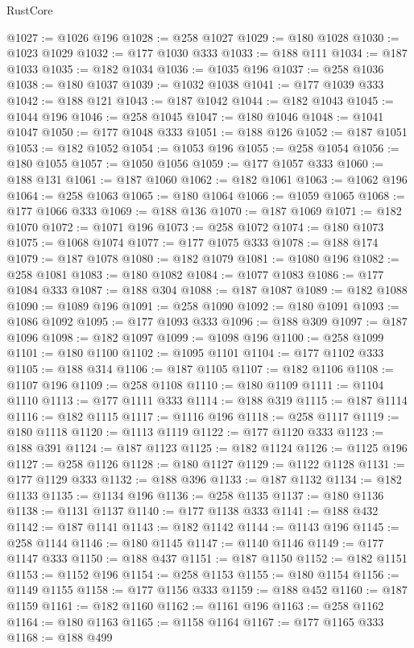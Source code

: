 \begin{lexlean}{RustCore}
\begin{coremodule}
@1027 := @1026 @196
@1028 := @258 @1027
@1029 := @180 @1028
@1030 := @1023 @1029
@1032 := @177 @1030 @333
@1033 := @188 @111
@1034 := @187 @1033
@1035 := @182 @1034
@1036 := @1035 @196
@1037 := @258 @1036
@1038 := @180 @1037
@1039 := @1032 @1038
@1041 := @177 @1039 @333
@1042 := @188 @121
@1043 := @187 @1042
@1044 := @182 @1043
@1045 := @1044 @196
@1046 := @258 @1045
@1047 := @180 @1046
@1048 := @1041 @1047
@1050 := @177 @1048 @333
@1051 := @188 @126
@1052 := @187 @1051
@1053 := @182 @1052
@1054 := @1053 @196
@1055 := @258 @1054
@1056 := @180 @1055
@1057 := @1050 @1056
@1059 := @177 @1057 @333
@1060 := @188 @131
@1061 := @187 @1060
@1062 := @182 @1061
@1063 := @1062 @196
@1064 := @258 @1063
@1065 := @180 @1064
@1066 := @1059 @1065
@1068 := @177 @1066 @333
@1069 := @188 @136
@1070 := @187 @1069
@1071 := @182 @1070
@1072 := @1071 @196
@1073 := @258 @1072
@1074 := @180 @1073
@1075 := @1068 @1074
@1077 := @177 @1075 @333
@1078 := @188 @174
@1079 := @187 @1078
@1080 := @182 @1079
@1081 := @1080 @196
@1082 := @258 @1081
@1083 := @180 @1082
@1084 := @1077 @1083
@1086 := @177 @1084 @333
@1087 := @188 @304
@1088 := @187 @1087
@1089 := @182 @1088
@1090 := @1089 @196
@1091 := @258 @1090
@1092 := @180 @1091
@1093 := @1086 @1092
@1095 := @177 @1093 @333
@1096 := @188 @309
@1097 := @187 @1096
@1098 := @182 @1097
@1099 := @1098 @196
@1100 := @258 @1099
@1101 := @180 @1100
@1102 := @1095 @1101
@1104 := @177 @1102 @333
@1105 := @188 @314
@1106 := @187 @1105
@1107 := @182 @1106
@1108 := @1107 @196
@1109 := @258 @1108
@1110 := @180 @1109
@1111 := @1104 @1110
@1113 := @177 @1111 @333
@1114 := @188 @319
@1115 := @187 @1114
@1116 := @182 @1115
@1117 := @1116 @196
@1118 := @258 @1117
@1119 := @180 @1118
@1120 := @1113 @1119
@1122 := @177 @1120 @333
@1123 := @188 @391
@1124 := @187 @1123
@1125 := @182 @1124
@1126 := @1125 @196
@1127 := @258 @1126
@1128 := @180 @1127
@1129 := @1122 @1128
@1131 := @177 @1129 @333
@1132 := @188 @396
@1133 := @187 @1132
@1134 := @182 @1133
@1135 := @1134 @196
@1136 := @258 @1135
@1137 := @180 @1136
@1138 := @1131 @1137
@1140 := @177 @1138 @333
@1141 := @188 @432
@1142 := @187 @1141
@1143 := @182 @1142
@1144 := @1143 @196
@1145 := @258 @1144
@1146 := @180 @1145
@1147 := @1140 @1146
@1149 := @177 @1147 @333
@1150 := @188 @437
@1151 := @187 @1150
@1152 := @182 @1151
@1153 := @1152 @196
@1154 := @258 @1153
@1155 := @180 @1154
@1156 := @1149 @1155
@1158 := @177 @1156 @333
@1159 := @188 @452
@1160 := @187 @1159
@1161 := @182 @1160
@1162 := @1161 @196
@1163 := @258 @1162
@1164 := @180 @1163
@1165 := @1158 @1164
@1167 := @177 @1165 @333
@1168 := @188 @499

\end{coremodule}
\end{lexlean}

